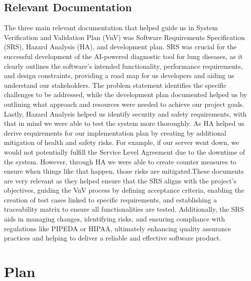 \documentclass[12pt, titlepage]{article}
\begin{document}
\subsection{Relevant Documentation}

The three main relevant documentation that helped guide us in System Verification and Validation Plan (VnV) was Software Requirements Specification (SRS), Hazard Analysis (HA), and development plan. SRS was crucial for the successful development of the AI-powered diagnostic tool for lung diseases, as it clearly outlines the software’s intended functionality, performance requirements, and design constraints, providing a road map for us developers and aiding us understand our stakeholders.  The problem statement identifies the specific challenges to be addressed, while the development plan documented helped us by outlining what approach and resources were needed to achieve our project goals. Lastly, Hazard Analysis helped us identify security and safety requirements, with that in mind we were able to test the system more thoroughly. As HA helped us derive requirements for our implementation plan by creating by additional mitigation of health and safety risks. For example, if our server went down, we would not potentially fulfill the Service Level Agreement due to the downtime of the system. However, through HA we were able to create counter measures to ensure when things like that happen, those risks are mitigated.These documents are very relevant as they helped ensure that the SRS aligns with the project’s objectives, guiding the VnV process by defining acceptance criteria, enabling the creation of test cases linked to specific requirements, and establishing a traceability matrix to ensure all functionalities are tested. Additionally, the SRS aids in managing changes, identifying risks, and ensuring compliance with regulations like PIPEDA or HIPAA, ultimately enhancing quality assurance practices and helping to deliver a reliable and effective software product.



\citet{SRS}


\section{Plan}

\end{document}
